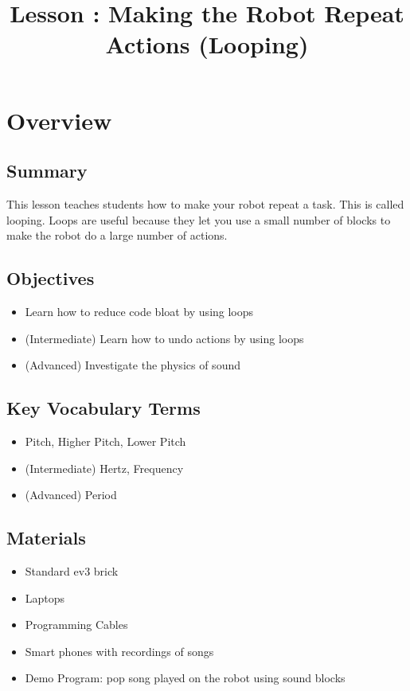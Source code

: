 \documentclass{lessonplan}
\title{Lesson \lessonNumber: Making the Robot Repeat Actions (Looping)}
\author{\linkHome}
\date{}
\begin{document}
  \maketitle

  \section{Overview}
    \subsection{Summary}
      This lesson teaches students how to make your robot repeat a task. This is called looping. Loops are useful because they let you use a small number of blocks to make the robot do a large number of actions.
      
    \subsection{Objectives}
    \begin{itemize}
      \item Learn how to reduce code bloat by using loops
      \item (Intermediate) Learn how to undo actions by using loops
      \item (Advanced) Investigate the physics of sound
    \end{itemize}
    
    \subsection{Key Vocabulary Terms}
    \begin{itemize}
      \item Pitch, Higher Pitch, Lower Pitch
      \item (Intermediate) Hertz, Frequency
      \item (Advanced) Period
    \end{itemize}
    
    \subsection{Materials}
      \begin{itemize}
        \item Standard ev3 brick
        \item Laptops
        \item Programming Cables
        \item Smart phones with recordings of songs
        \item Demo Program: pop song played on the robot using sound
          blocks
      \end{itemize}
      
\end{document}
